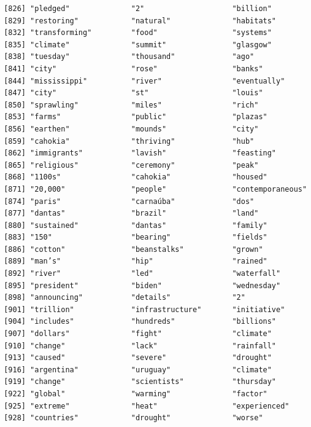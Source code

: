 \documentclass[
  letterpaper,
  DIV=11,
  numbers=noendperiod]{scrartcl}
\begin{document}
\begin{verbatim}
 [826] "pledged"              "2"                    "billion"             
 [829] "restoring"            "natural"              "habitats"            
 [832] "transforming"         "food"                 "systems"             
 [835] "climate"              "summit"               "glasgow"             
 [838] "tuesday"              "thousand"             "ago"                 
 [841] "city"                 "rose"                 "banks"               
 [844] "mississippi"          "river"                "eventually"          
 [847] "city"                 "st"                   "louis"               
 [850] "sprawling"            "miles"                "rich"                
 [853] "farms"                "public"               "plazas"              
 [856] "earthen"              "mounds"               "city"                
 [859] "cahokia"              "thriving"             "hub"                 
 [862] "immigrants"           "lavish"               "feasting"            
 [865] "religious"            "ceremony"             "peak"                
 [868] "1100s"                "cahokia"              "housed"              
 [871] "20,000"               "people"               "contemporaneous"     
 [874] "paris"                "carnaúba"             "dos"                 
 [877] "dantas"               "brazil"               "land"                
 [880] "sustained"            "dantas"               "family"              
 [883] "150"                  "bearing"              "fields"              
 [886] "cotton"               "beanstalks"           "grown"               
 [889] "man’s"                "hip"                  "rained"              
 [892] "river"                "led"                  "waterfall"           
 [895] "president"            "biden"                "wednesday"           
 [898] "announcing"           "details"              "2"                   
 [901] "trillion"             "infrastructure"       "initiative"          
 [904] "includes"             "hundreds"             "billions"            
 [907] "dollars"              "fight"                "climate"             
 [910] "change"               "lack"                 "rainfall"            
 [913] "caused"               "severe"               "drought"             
 [916] "argentina"            "uruguay"              "climate"             
 [919] "change"               "scientists"           "thursday"            
 [922] "global"               "warming"              "factor"              
 [925] "extreme"              "heat"                 "experienced"         
 [928] "countries"            "drought"              "worse"               

\end{verbatim}
\end{document}
